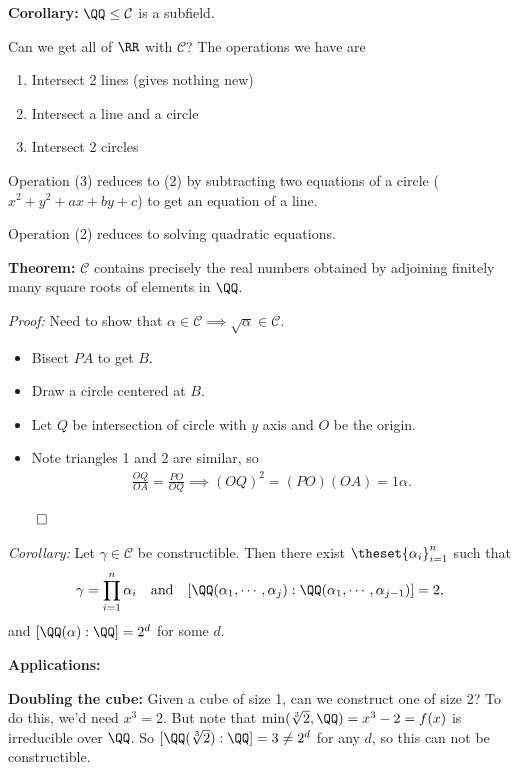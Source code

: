 \textbf{Corollary:} \(\QQ \leq \mathcal C\) is a subfield.

Can we get all of \(\RR\) with \(\mathcal C\)? The operations we have
are

\begin{enumerate}
\def\labelenumi{\arabic{enumi}.}
\item
  Intersect 2 lines (gives nothing new)
\item
  Intersect a line and a circle
\item
  Intersect 2 circles
\end{enumerate}

Operation (3) reduces to (2) by subtracting two equations of a circle
(\(x^2 + y^2 + ax + by + c\)) to get an equation of a line.

Operation (2) reduces to solving quadratic equations.

\textbf{Theorem:} \(\mathcal C\) contains precisely the real numbers
obtained by adjoining finitely many square roots of elements in \(\QQ\).

\emph{Proof:} Need to show that
\(\alpha \in \mathcal C \implies \sqrt \alpha \in \mathcal C\).

\begin{itemize}
\item
  Bisect \(PA\) to get \(B\).
\item
  Draw a circle centered at \(B\).
\item
  Let \(Q\) be intersection of circle with \(y\) axis and \(O\) be the
  origin.
\item
  Note triangles 1 and 2 are similar, so
  \begin{align*}
  \frac{OQ}{OA} = \frac{PO}{OQ} \implies (OQ)^2 = (PO)(OA) = 1\alpha
  .\end{align*}
\end{itemize}

\(\qed\)

\emph{Corollary:} Let \(\gamma \in \mathcal{C}\) be constructible. Then
there exist \(\theset{\alpha_i}_{i=1}^n\) such that
\begin{align*}
\gamma = \prod_{i=1}^n \alpha_i
\quad\text{and}\quad
[\QQ(\alpha_1, \cdots, \alpha_j): \QQ(\alpha_1, \cdots, \alpha_{j-1})] = 2
,\end{align*} and \([\QQ(\alpha): \QQ] = 2^d\) for some \(d\).

\textbf{Applications:}

\textbf{Doubling the cube:} Given a cube of size 1, can we construct one
of size 2? To do this, we'd need \(x^3 = 2\). But note that
\(\min(\sqrt[3]{2}, \QQ) = x^3 - 2 = f(x)\) is irreducible over \(\QQ\).
So \([\QQ(\sqrt[3]{2}): \QQ] = 3 \neq 2^d\) for any \(d\), so this can
not be constructible.

